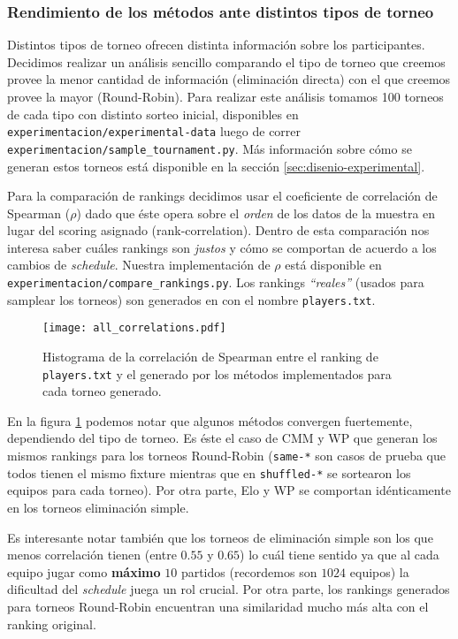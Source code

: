\documentclass[a4paper]{article}
\begin{document}
\subsubsection{Rendimiento de los métodos ante distintos tipos de torneo}

Distintos tipos de torneo ofrecen distinta información sobre los participantes. Decidimos realizar un análisis sencillo comparando el tipo de torneo que creemos provee la menor cantidad de información (eliminación directa) con el que creemos provee la mayor (Round-Robin). Para realizar este análisis tomamos 100 torneos de cada tipo con distinto sorteo inicial, disponibles en \texttt{experimentacion/experimental-data} luego de correr \texttt{experimentacion/sample\_tournament.py}. Más información sobre cómo se generan estos torneos está disponible en la sección \ref{sec:disenio-experimental}.

Para la comparación de rankings decidimos usar el coeficiente de correlación de Spearman ($\rho$) dado que éste opera sobre el \textit{orden} de los datos de la muestra en lugar del scoring asignado (rank-correlation). Dentro de esta comparación nos interesa saber cuáles rankings son \textit{justos} y cómo se comportan de acuerdo a los cambios de \textit{schedule}. Nuestra implementación de $\rho$ está disponible en \texttt{experimentacion/compare\_rankings.py}. Los rankings \textit{``reales''} (usados para samplear los torneos) son generados en con el nombre \texttt{players.txt}.

\begin{figure}[H]
    \centering
    \texttt{[image: all\_correlations.pdf]}
    \caption{Histograma de la correlación de Spearman entre el ranking de \texttt{players.txt} y el generado por los métodos implementados para cada torneo generado.}
    \label{fig:histrho}
\end{figure}

En la figura \ref{fig:histrho} podemos notar que algunos métodos convergen fuertemente, dependiendo del tipo de torneo. Es éste el caso de CMM y WP que generan los mismos rankings para los torneos Round-Robin (\texttt{same-*} son casos de prueba que todos tienen el mismo fixture mientras que en  \texttt{shuffled-*} se sortearon los equipos para cada torneo). Por otra parte, Elo y WP se comportan idénticamente en los torneos eliminación simple.

Es interesante notar también que los torneos de eliminación simple son los que menos correlación tienen (entre $0.55$ y $0.65$) lo cuál tiene sentido ya que al cada equipo jugar como \textbf{máximo} $10$ partidos (recordemos son $1024$ equipos) la dificultad del \textit{schedule} juega un rol crucial. Por otra parte, los rankings generados para torneos Round-Robin encuentran una similaridad mucho más alta con el ranking original.
\end{document}
